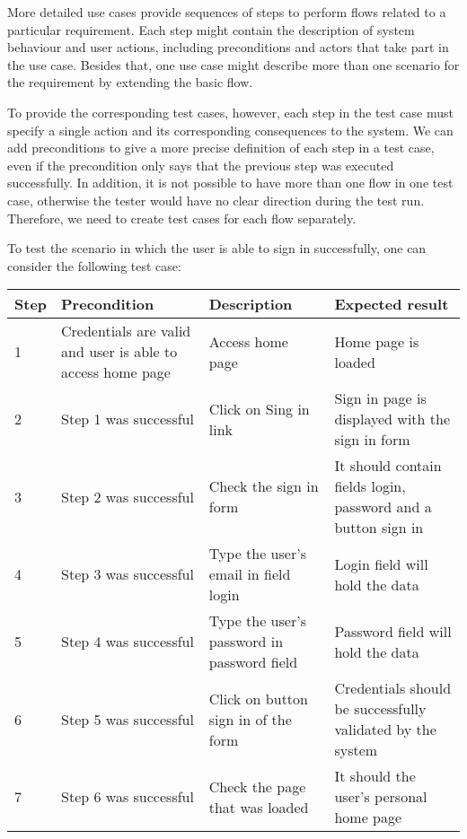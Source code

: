 More detailed use cases provide sequences of steps to perform flows related to a particular requirement. Each step might contain the description of system behaviour and user actions, including preconditions and actors that take part in the use case. Besides that, one use case might describe more than one scenario for the requirement by extending the basic flow. 

To provide the corresponding test cases, however, each step in the test case must specify a single action and its corresponding consequences to the system. We can add preconditions to give a more precise definition of each step in a test case, even if the precondition only says that the previous step was executed successfully. In addition, it is not possible to have more than one flow in one test case, otherwise the tester would have no clear direction during the test run. Therefore, we need to create test cases for each flow separately.

To test the scenario in which the user is able to sign in successfully, one can consider the following test case:

\begin{center}

\begin{tabular}{| l | p{3cm} | p{5cm} | p{5cm} |}
\hline

Step & Precondition & Description & Expected result \\ \hline

1 & Credentials are valid and user is able to access home page & Access home page & Home page is loaded\\ \hline

2 & Step 1 was successful & Click on Sing in link & Sign in page is displayed with the sign in form \\ \hline

3 & Step 2 was successful & Check the sign in form & It should contain fields login, password and a button sign in \\ \hline

4 & Step 3 was successful & Type the user's email in field login & Login field will hold the data\\ \hline

5 & Step 4 was successful & Type the user's password in password field & Password field will hold the data \\ \hline

6 & Step 5 was successful & Click on button sign in of the form & Credentials should be successfully validated by the system \\ \hline

7 & Step 6 was successful & Check the page that was loaded & It should the user's personal home page\\

\hline
\end{tabular}

\end{center}

